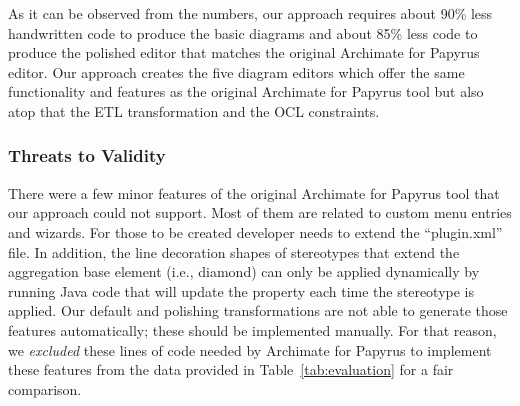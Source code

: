 As it can be observed from the numbers, our approach requires about 90\% less handwritten code to produce the basic diagrams and about 85\% less code to 
produce the polished editor that matches the original Archimate for Papyrus editor. 
Our approach creates the five diagram editors which offer the same functionality and features as the original Archimate for Papyrus tool but also atop that the ETL transformation and the OCL constraints.

\subsubsection{Threats to Validity}
There were a few minor features of the original Archimate for Papyrus tool that our approach could not support. 
Most of them are related to custom menu entries and wizards. For those to be created developer needs to extend the ``plugin.xml'' file. 
In addition, the line decoration shapes of stereotypes that extend the aggregation base element (i.e., diamond) can only be applied dynamically by running Java code that will update the property each time the stereotype is applied. 
Our default and polishing transformations are not able to generate those features automatically; these should be implemented manually. 
For that reason, we \textit{excluded} these lines of code needed by Archimate for Papyrus to implement these features from the data provided in Table~\ref{tab:evaluation} for a fair comparison. 


